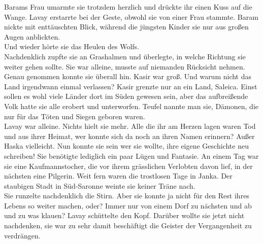 Barams Frau umarmte sie trotzdem herzlich und drückte ihr einen Kuss auf die Wange. Lavay erstarrte 
bei der Geste, obwohl sie von einer Frau stammte. Baram nickte mit enttäuschten Blick, während die 
jüngsten Kinder sie nur aus großen Augen anblickten.\\
Und wieder hörte sie das Heulen des Wolfs.\\
Nachdenklich zupfte sie an Grashalmen und überlegte, in welche Richtung sie weiter gehen sollte. Sie 
war alleine, musste auf niemanden Rücksicht nehmen. Genau genommen konnte sie überall hin. Kasir 
war groß. Und warum nicht das Land irgendwann einmal verlassen? Kasir grenzte nur an ein Land, 
Saleica. Einst sollen es wohl viele Länder dort im Süden gewesen sein, aber das aufbreißende 
Volk hatte sie alle erobert und unterworfen. Teufel nannte man sie, Dämonen, die nur für das 
Töten und Siegen geboren waren.\\
Lavay war alleine. Nichts hielt sie mehr. Alle die ihr am Herzen lagen waren Tod und aus ihrer 
Heimat, wer konnte sich da noch an ihren Namen erinnern? Außer Haska vielleicht. Nun konnte sie 
sein wer sie wollte, ihre eigene Geschichte neu schreiben! Sie benötigte lediglich ein paar Lügen 
und Fantasie. An einem Tag war sie eine Kaufmannstocher, die vor ihrem grässlichen Verlobten davon 
lief, in der nächsten eine Pilgerin. Weit fern waren die trostlosen Tage in Janka. Der staubigen 
Stadt in Süd-Saronne weinte sie keiner Träne nach.\\
Sie runzelte nachdenklich die Stirn. Aber sie konnte ja nicht für den Rest ihres Lebens so weiter 
machen, oder? Immer nur von einem Dorf zu nächsten und ab und zu was klauen? Lavay schüttelte den 
Kopf. Darüber wollte sie jetzt nicht nachdenken, sie war zu sehr damit beschäftigt die Geister der 
Vergangenheit zu verdrängen.\\

